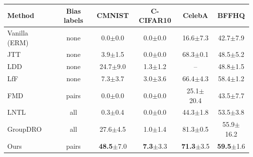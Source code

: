 \begin{tabular}{lccccc}
\toprule
Method & Bias labels & CMNIST & C-CIFAR10 & CelebA & BFFHQ \\
\midrule
Vanilla (ERM) & none & 0.0{\scriptsize$\pm$0.0} & 0.0{\scriptsize$\pm$0.0} & 16.6{\scriptsize$\pm$7.3} & 42.7{\scriptsize$\pm$7.9} \\
JTT~\cite{liu2021jtt} & none & 3.9{\scriptsize$\pm$1.5} & 0.0{\scriptsize$\pm$0.0} & 68.3{\scriptsize$\pm$0.1} & 48.5{\scriptsize$\pm$5.2} \\
LDD~\cite{lee2021ldd} & none & 24.7{\scriptsize$\pm$9.0} & 1.3{\scriptsize$\pm$1.2} & – & 48.8{\scriptsize$\pm$1.5} \\
LfF~\cite{nam2020lff} & none & 7.3{\scriptsize$\pm$3.7} & 3.0{\scriptsize$\pm$3.6} & 66.4{\scriptsize$\pm$4.3} & 58.4{\scriptsize$\pm$1.2} \\
FMD~\cite{chen2023fmd} & pairs & 0.0{\scriptsize$\pm$0.0} & 0.0{\scriptsize$\pm$0.0} & 25.1{\scriptsize$\pm$20.4} & 43.5{\scriptsize$\pm$7.7} \\
LNTL~\cite{kim2019lntl} & all & 0.3{\scriptsize$\pm$0.4} & 0.0{\scriptsize$\pm$0.0} & 44.3{\scriptsize$\pm$1.8} & 53.5{\scriptsize$\pm$3.8} \\
GroupDRO~\cite{sagawa2020groupdro} & all & 27.6{\scriptsize$\pm$4.5} & 1.0{\scriptsize$\pm$1.4} & 81.3{\scriptsize$\pm$0.5} & 55.9{\scriptsize$\pm$16.2} \\
Ours & pairs & \textbf{48.5}{\scriptsize$\pm$7.0} & \textbf{7.3}{\scriptsize$\pm$3.3} & \textbf{71.3}{\scriptsize$\pm$3.5} & \textbf{59.5}{\scriptsize$\pm$1.6} \\
\bottomrule
\end{tabular}
